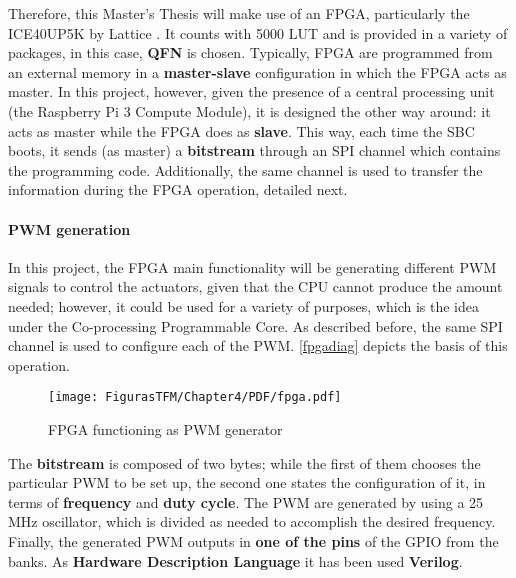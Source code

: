 Therefore, this Master's Thesis will make use of an \acrshort{FPGA}, particularly the ICE40UP5K by Lattice \cite{up5k}. It counts with 5000 \acrshort{LUT} and is provided in a variety of packages, in this case, \textbf{QFN} is chosen. Typically,  \acrshort{FPGA} are programmed from an external memory in a \textbf{master-slave} configuration in which the \acrshort{FPGA} acts as master. In this project, however, given the presence of a central processing unit (the Raspberry Pi 3 Compute Module), it is designed the other way around: it acts as master while the \acrshort{FPGA} does as \textbf{slave}. This way, each time the \acrshort{SBC} boots, it sends (as master) a \textbf{bitstream} through an \acrshort{SPI} channel which contains the programming code. Additionally, the same channel is used to transfer the information during the \acrshort{FPGA} operation, detailed next.

\paragraph{PWM generation}

In this project, the \acrshort{FPGA} main functionality will be generating different \acrshort{PWM} signals to control the actuators, given that the \acrshort{CPU} cannot produce the amount needed; however, it could be used for a variety of purposes, which is the idea under the Co-processing Programmable Core. As described before, the same \acrshort{SPI} channel is used to configure each of the \acrshort{PWM}. \autoref{fpgadiag} depicts the basis of this operation.

		\begin{figure} [H]
			\centering
			\texttt{[image: FigurasTFM/Chapter4/PDF/fpga.pdf]}
			\caption{\acrshort{FPGA} functioning as \acrshort{PWM} generator }      		\label{fpgadiag}
\end{figure}

The \textbf{bitstream} is composed of two bytes; while the first of them chooses the particular \acrshort{PWM} to be set up, the second one states the configuration of it, in terms of \textbf{frequency} and \textbf{duty cycle}. The \acrshort{PWM} are generated by using a 25 MHz  oscillator, which is divided as needed to accomplish the desired frequency. Finally, the generated \acrshort{PWM} outputs in \textbf{one of the pins} of the \acrshort{GPIO} from the banks. As \textbf{Hardware Description Language} it has been used \textbf{Verilog}.


